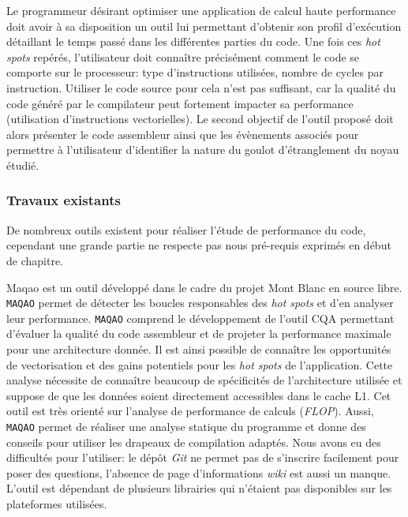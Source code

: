         Le programmeur désirant optimiser une application de calcul haute performance doit avoir à sa disposition un outil lui permettant d'obtenir son profil d'exécution détaillant le temps passé dans les différentes parties du code. Une fois ces \textit{hot spots} repérés, l'utilisateur doit connaître précisément comment le code se comporte sur le processeur: type d'instructions utilisées, nombre de cycles par instruction. Utiliser le code source pour cela n'est pas suffisant, car la qualité du code généré par le compilateur peut fortement impacter sa performance (utilisation d'instructions vectorielles). Le second objectif de l'outil proposé doit alors présenter le code assembleur ainsi que les évènements associés pour permettre à l'utilisateur d'identifier la nature du goulot d'étranglement du noyau étudié.
        
        



    \subsubsection{Travaux existants}
        
        De nombreux outils existent pour réaliser l'étude de performance du code, cependant une grande partie ne respecte pas nous pré-requis exprimés en début de chapitre. 
        
        Maqao \cite{Barthou2010} est un outil développé dans le cadre du projet Mont Blanc \cite{Puzovic2012} en source libre.  \verb=MAQAO= permet de détecter les boucles responsables des \textit{hot spots} et d’en analyser leur performance. \verb=MAQAO= comprend le développement de l’outil CQA \cite{Charif-Rubial2014} permettant d’évaluer la qualité du code assembleur et de projeter la performance maximale pour une architecture donnée.  Il est ainsi possible de connaître  les opportunités de vectorisation et des gains potentiels pour les \textit{hot spots} de l'application. Cette analyse nécessite de connaître beaucoup de spécificités de l'architecture utilisée et suppose de que les données soient directement accessibles dans le cache L1. Cet outil est très orienté sur l'analyse de performance de calculs (\textit{FLOP}). Aussi, \verb=MAQAO= permet de réaliser une analyse statique du programme et donne des conseils pour utiliser les drapeaux de compilation adaptés.
        Nous avons eu des difficultés pour l'utiliser: le dépôt \textit{Git} ne permet pas de s'inscrire facilement pour poser des questions, l'absence de page d'informations \textit{wiki} est aussi un manque. L'outil est dépendant de plusieurs librairies qui n'étaient pas disponibles sur les plateformes utilisées. 
        
